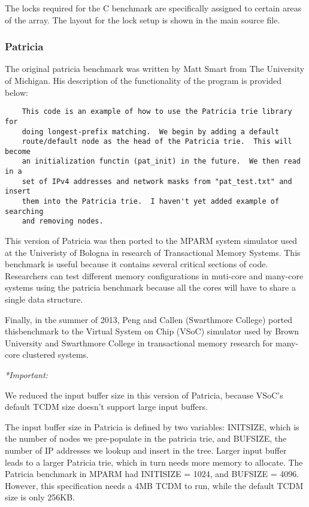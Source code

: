 \documentclass{article}
\begin{document}
The locks required for the C benchmark are specifically assigned to certain 
areas of the array. The layout for the lock setup is shown in the main source 
file.

\subsubsection{Patricia}

The original patricia benchmark was written by Matt Smart from The University of
 Michigan. His description of the functionality of the program is provided
below:

\begin{verbatim}
    This code is an example of how to use the Patricia trie library for
    doing longest-prefix matching.  We begin by adding a default
    route/default node as the head of the Patricia trie.  This will become
    an initialization functin (pat_init) in the future.  We then read in a
    set of IPv4 addresses and network masks from "pat_test.txt" and insert
    them into the Patricia trie.  I haven't yet added example of searching
    and removing nodes.
\end{verbatim}

This version of Patricia was then ported to the MPARM system simulator used at 
the Univeristy of Bologna in research of Transactional Memory Systems. This
benchmark is useful because it contains several critical sections of code. 
Researchers can test different memory configurations in muti-core and many-core 
systems using the patricia benchmark because all the cores will have to share a 
single data structure. 

Finally, in the summer of 2013, Peng and Callen (Swarthmore College) ported 
thisbenchmark to the Virtual System on Chip (VSoC) simulator used by Brown 
University and Swarthmore College in transactional memory research for 
many-core clustered systems. 

\vspace{2mm}
\emph{*Important:} 

We reduced the input buffer size in this version of Patricia, because VSoC's default TCDM size doesn't support large input buffers. 

The input buffer size in Patricia is defined by two variables: INITSIZE, which is the number of nodes we pre-populate in the patricia trie, and BUFSIZE, the number of IP addresses we lookup and insert in the tree. Larger input buffer leads to a larger Patricia trie, which in turn needs more memory to allocate. The Patricia benchmark in MPARM had INITISIZE = 1024, and BUFSIZE = 4096. However, this specification needs a 4MB TCDM to run, while the default TCDM size is only 256KB. 
\end{document}
